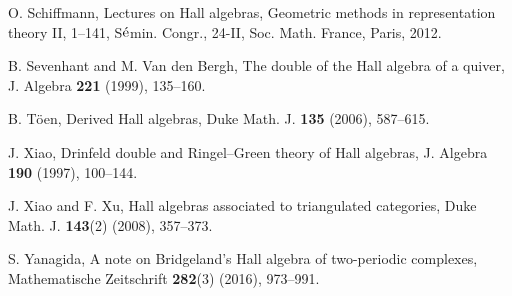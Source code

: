 \documentclass[reqno,12pt]{amsart}
\numberwithin{equation}{section}
\theoremstyle{plain} %
\theoremstyle{definition} %
\begin{document}
\begin{thebibliography}{99}
 O. Schiffmann, {Lectures on Hall algebras},
Geometric methods in representation theory II,  1--141, S$\acute{\rm e}$min. Congr., 24-II,
Soc. Math. France, Paris, 2012.

 B. Sevenhant and M. Van den Bergh, {The double of the Hall algebra of a quiver}, J. Algebra {\bf 221} (1999), 135--160.


 B. T\"oen, {Derived Hall algebras}, Duke Math.
J. {\bf 135} (2006), 587--615.

 J. Xiao, {Drinfeld double and Ringel--Green theory of Hall
algebras}, J. Algebra {\bf190} (1997), 100--144.

 J. Xiao and F. Xu, {Hall algebras associated to triangulated categories}, Duke Math. J. {\bf 143}(2) (2008), 357--373.

 S. Yanagida, {A note on Bridgeland's Hall algebra of two-periodic complexes}, Mathematische Zeitschrift {\bf 282}(3) (2016), 973--991.

\end{thebibliography}
\end{document}
